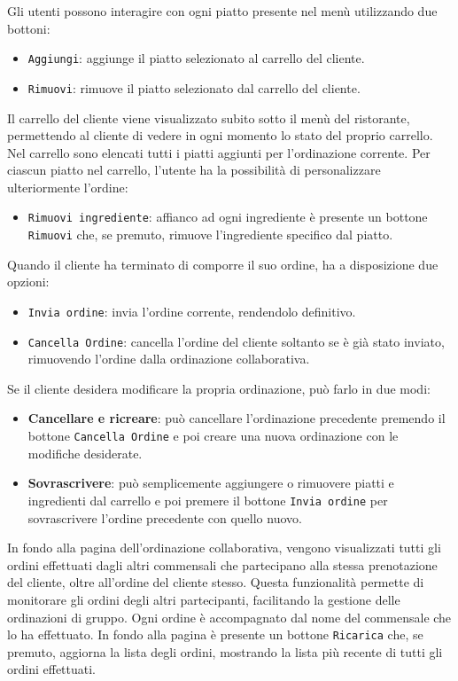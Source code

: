Gli utenti possono interagire con ogni piatto presente nel menù utilizzando due bottoni:
\begin{itemize}
    \item \texttt{Aggiungi}: aggiunge il piatto selezionato al carrello del cliente.
    \item \texttt{Rimuovi}: rimuove il piatto selezionato dal carrello del cliente.
\end{itemize}

Il carrello del cliente viene visualizzato subito sotto il menù del ristorante, permettendo al cliente di vedere in ogni momento lo stato del proprio carrello. 
Nel carrello sono elencati tutti i piatti aggiunti per l'ordinazione corrente. Per ciascun piatto nel carrello, l'utente ha la possibilità di personalizzare ulteriormente 
l'ordine:
\begin{itemize}
    \item \texttt{Rimuovi ingrediente}: affianco ad ogni ingrediente è presente un bottone \texttt{Rimuovi} che, se premuto, rimuove l'ingrediente specifico dal piatto.
\end{itemize}

Quando il cliente ha terminato di comporre il suo ordine, ha a disposizione due opzioni:
\begin{itemize}
    \item \texttt{Invia ordine}: invia l'ordine corrente, rendendolo definitivo.
    \item \texttt{Cancella Ordine}: cancella l'ordine del cliente soltanto se è già stato inviato, rimuovendo l'ordine dalla ordinazione collaborativa.
\end{itemize}

Se il cliente desidera modificare la propria ordinazione, può farlo in due modi:
\begin{itemize}
    \item \textbf{Cancellare e ricreare}: può cancellare l'ordinazione precedente premendo il bottone \texttt{Cancella Ordine} e poi creare una nuova ordinazione 
	con le modifiche desiderate.
    \item \textbf{Sovrascrivere}: può semplicemente aggiungere o rimuovere piatti e ingredienti dal carrello e poi premere il bottone \texttt{Invia ordine} 
	per sovrascrivere l'ordine precedente con quello nuovo.
\end{itemize}


In fondo alla pagina dell'ordinazione collaborativa, vengono visualizzati tutti gli ordini effettuati dagli altri commensali che partecipano alla stessa prenotazione 
del cliente, oltre all'ordine del cliente stesso. Questa funzionalità permette di monitorare gli ordini degli altri partecipanti, facilitando la gestione delle ordinazioni 
di gruppo. Ogni ordine è accompagnato dal nome del commensale che lo ha effettuato.
In fondo alla pagina è presente un bottone \texttt{Ricarica} che, se premuto, aggiorna la lista degli ordini, mostrando la lista più recente di tutti gli ordini effettuati.


